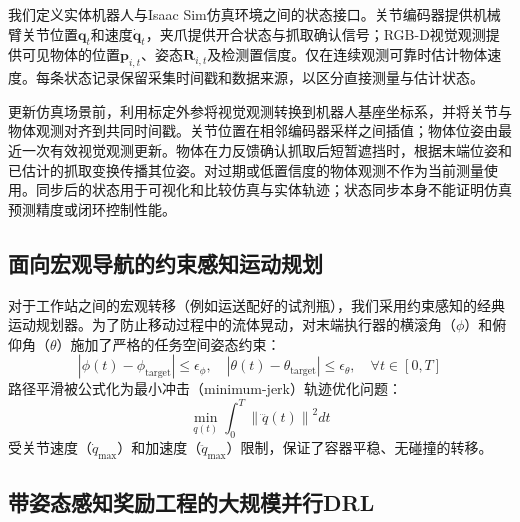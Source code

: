 我们定义实体机器人与Isaac Sim仿真环境之间的状态接口。关节编码器提供机械臂关节位置$\mathbf q_t$和速度$\dot{\mathbf q}_t$，夹爪提供开合状态与抓取确认信号；RGB-D视觉观测提供可见物体的位置$\mathbf p_{i,t}$、姿态$\mathbf R_{i,t}$及检测置信度。仅在连续观测可靠时估计物体速度。每条状态记录保留采集时间戳和数据来源，以区分直接测量与估计状态。

更新仿真场景前，利用标定外参将视觉观测转换到机器人基座坐标系，并将关节与物体观测对齐到共同时间戳。关节位置在相邻编码器采样之间插值；物体位姿由最近一次有效视觉观测更新。物体在力反馈确认抓取后短暂遮挡时，根据末端位姿和已估计的抓取变换传播其位姿。对过期或低置信度的物体观测不作为当前测量使用。同步后的状态用于可视化和比较仿真与实体轨迹；状态同步本身不能证明仿真预测精度或闭环控制性能。

\subsection{面向宏观导航的约束感知运动规划}
\label{subsec:macro_planning}


对于工作站之间的宏观转移（例如运送配好的试剂瓶），我们采用约束感知的经典运动规划器。为了防止移动过程中的流体晃动，对末端执行器的横滚角（$\phi$）和俯仰角（$\theta$）施加了严格的任务空间姿态约束：
\begin{equation}
    |\phi(t) - \phi_{\text{target}}| \leq \epsilon_{\phi}, \quad |\theta(t) - \theta_{\text{target}}| \leq \epsilon_{\theta}, \quad \forall t \in [0, T]
\end{equation}
路径平滑被公式化为最小冲击（minimum-jerk）轨迹优化问题：
\begin{equation}
    \min_{q(t)} \int_{0}^{T} \left\| \dddot{q}(t) \right\|^2 dt
\end{equation}
受关节速度（$\dot{q}_{\max}$）和加速度（$\ddot{q}_{\max}$）限制，保证了容器平稳、无碰撞的转移。

\subsection{带姿态感知奖励工程的大规模并行DRL}
\label{subsec:arm_rl}

